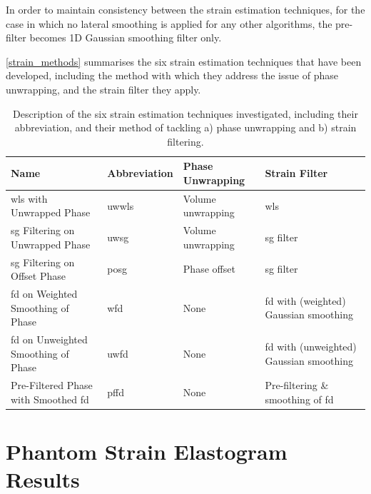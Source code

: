 

In order to maintain consistency between the strain estimation techniques, for the case in which no lateral smoothing is applied for any other algorithms, the pre-filter becomes 1D Gaussian smoothing filter only.

\autoref{strain_methods} summarises the six strain estimation techniques that have been developed, including the method with which they address the issue of phase unwrapping, and the strain filter they apply.

\begin{table}[h]
	\centering
	\begin{tabularx}{\textwidth}{YlYY}
		\toprule
		Name & Abbreviation & Phase Unwrapping & Strain Filter \\
		\midrule
		\ac{wls} with Unwrapped Phase & \ac{uwwls} & Volume unwrapping & \ac{wls} \\
		\ac{sg} Filtering on Unwrapped Phase & \ac{uwsg} & Volume unwrapping & \ac{sg} filter \\
		\ac{sg} Filtering on Offset Phase & \ac{posg} & Phase offset & \ac{sg} filter \\
		\ac{fd} on Weighted Smoothing of Phase & \ac{wfd} & None & \ac{fd} with (weighted) Gaussian smoothing \\
		\ac{fd} on Unweighted Smoothing of Phase & \ac{uwfd} & None & \ac{fd} with (unweighted) Gaussian smoothing \\
		Pre-Filtered Phase with Smoothed \ac{fd} & \ac{pffd} & None & Pre-filtering \& smoothing of \ac{fd} \\
		\bottomrule
	\end{tabularx}
	\caption{Description of the six strain estimation techniques investigated, including their abbreviation, and their method of tackling a) phase unwrapping and b) strain filtering.}
	\label{strain_methods}
\end{table}

\section{Phantom Strain Elastogram Results}\label{phantom_results}

